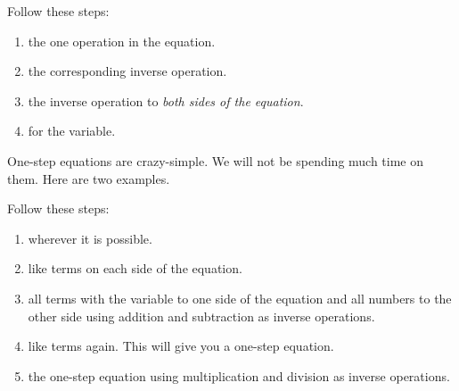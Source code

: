 \documentclass[fleqn,letterpaper,12pt,printwatermark=false]{memoir}
\begin{document}
\begin{myKeyConcepts}
    Follow these steps:
    \begin{enumerate}
        \item {} the one operation in the equation.
        \item {} the corresponding inverse operation.
        \item {} the inverse operation to \emph{both sides of the equation}.
        \item {} for the variable. 
    \end{enumerate}
\end{myKeyConcepts}

One-step equations are crazy-simple.
We will not be spending much time on them.
Here are two examples.



\begin{myKeyConcepts}
    Follow these steps:
    \begin{enumerate}
        \item {} wherever it is possible.
        \item {} like terms on each side of the equation.
        \item {} all terms with the variable to one side of the equation
        and all numbers to the other side using addition and subtraction as inverse operations.
        \item {} like terms again. This will give you a one-step equation.
        \item {} the one-step equation using multiplication and division as inverse operations.
    \end{enumerate}
\end{myKeyConcepts}


\end{document}
